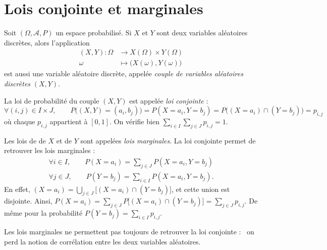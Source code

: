 \section{Lois conjointe et marginales}

\begin{prop-defn}
	Soit $(\Omega, \mathcal{A}, P)$\/ un espace probabilisé. Si $X$ et $Y$ sont deux variables aléatoires discrètes, alors l'application 
	\begin{align*}
		(X,Y): \Omega &\longrightarrow X(\Omega) \times Y(\Omega) \\
		\omega &\longmapsto \big(X(\omega), Y(\omega)\big)
	\end{align*}
	est aussi une variable aléatoire discrète, appelée \textit{couple de variables aléatoires discrètes} $(X, Y)$.
\end{prop-defn}

La loi de probabilité du couple $(X, Y)$ est appelée \textit{loi conjointe} : \[
	\forall (i,j) \in I \times J, \quad\quad P\big((X,Y) = (a_i, b_j)\big) = P(X = a_i, Y = b_j) = P\big((X = a_i) \cap (Y = b_j)\big) = p_{i,j}
\] où chaque $p_{i,j}$ appartient à $[0, 1]$. On vérifie bien $\sum_{i \in I}\sum_{j \in J} p_{i,j} = 1$.

Les lois de de $X$ et de $Y$ sont appelées \textit{lois marginales}. La loi conjointe permet de retrouver les lois marginales :
\begin{gather*}
	\forall i \in I, \quad\quad P(X = a_i) = \sum_{j \in J} P(X = a_i, Y = b_j)\\
	\forall j \in J,\quad\quad P(Y = b_j) = \sum_{i \in I} P(X = a_i, Y = b_j).
\end{gather*}
En effet, $(X = a_i) = \bigcup_{j \in J}\big[(X = a_i) \cap (Y = b_j)\big]$, et cette union est disjointe. Ainsi, $P(X = a_i) = \sum_{j \in J} P\big[(X = a_i) \cap (Y = b_j)\big] = \sum_{j \in J} p_{i,j}$. De même pour la probabilité $P(Y = b_j) = \sum_{i \in I} p_{i,j}$.

 Les lois marginales ne permettent pas toujours de retrouver la loi conjointe : \guillemotleft~on perd la notion de corrélation entre les deux variables aléatoires.~\guillemotright\@

